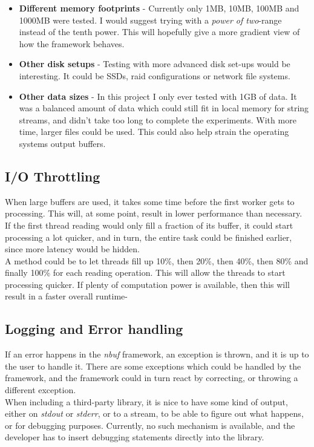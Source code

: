 \documentclass[a4paper]{article}
\newcommand{\nbuf}{\textit{nbuf} }
\begin{document}
\begin{itemize}
\item \textbf{Different memory footprints} - Currently only 1MB, 10MB, 100MB and 1000MB were tested. I would suggest trying with a \textit{power of two}-range instead of the tenth power. This will hopefully give a more gradient view of how the framework behaves.
\item \textbf{Other disk setups} - Testing with more advanced disk set-ups would be interesting. It could be SSDs, raid configurations or network file systems.
\item \textbf{Other data sizes} - In this project I only ever tested with 1GB of data. It was a balanced amount of data which could still fit in local memory for string streams, and didn't take too long to complete the experiments. With more time, larger files could be used. This could also help strain the operating systems output buffers.
\end{itemize}


\subsection{I/O Throttling}
When large buffers are used, it takes some time before the first worker gets to processing. This will, at some point, result in lower performance than necessary. If the first thread reading would only fill a fraction of its buffer, it could start processing a lot quicker, and in turn, the entire task could be finished earlier, since more latency would be hidden.\\

A method could be to let threads fill up 10\%, then 20\%, then 40\%, then 80\% and finally 100\% for each reading operation. This will allow the threads to start processing quicker. If plenty of computation power is available, then this will result in a faster overall runtime-


\subsection{Logging and Error handling}
If an error happens in the \nbuf framework, an exception is thrown, and it is up to the user to handle it. There are some exceptions which could be handled by the framework, and the framework could in turn react by correcting, or throwing a different exception.\\

When including a third-party library, it is nice to have some kind of output, either on \textit{stdout} or \textit{stderr}, or to a stream, to be able to figure out what happens, or for debugging purposes. Currently, no such mechanism is available, and the developer has to insert debugging statements directly into the library.







\end{document}
